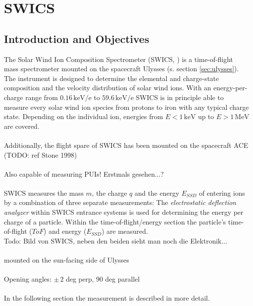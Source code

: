 \section{SWICS}

\subsection{Introduction and Objectives}
The Solar Wind Ion Composition Spectrometer (SWICS, \citet{gloeckler_1992}) is a time-of-flight mass spectrometer mounted on the spacecraft Ulysses (s. section \ref{sec:ulysses}). The instrument is designed to determine the elemental and charge-state composition and the velocity distribution of solar wind ions. With an energy-per-charge range from $0.16 \, \mathrm{keV/e}$ to $59.6 \, \mathrm{keV / e}$ SWICS is in principle able to measure every solar wind ion species from protons to iron with any typical charge state. Depending on the individual ion, energies from $E < 1 \,\mathrm{keV}$ up to $E > 1 \, \mathrm{MeV}$ are covered.
\\ \\
Additionally, the flight spare of SWICS has been mounted on the spacecraft ACE (TODO: ref Stone 1998)
\\ \\ 
Also capable of measuring PUIs! Erstmals gesehen...?
\\ \\
SWICS measures the mass $m$, the charge $q$ and the energy $E_{SSD}$ of entering ions by a combination of three separate measurements: The \textit{electrostatic deflection analyzer} within SWICS entrance systems is used for determining the energy per charge of a particle. Within the time-of-flight/energy section the particle's time-of-flight ($ToF$) and energy ($E_{SSD}$) are measured. \\ 
Todo: Bild von SWICS, neben den beiden sieht man noch die Elektronik...
\\ \\
mounted on the sun-facing side of Ulysses
\\ \\
Opening angles: $\pm\, 2$ deg perp, $90$ deg parallel  
\\ \\
In the following section the measurement is described in more detail.
